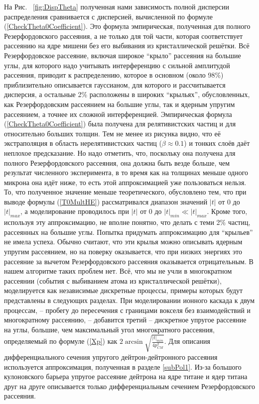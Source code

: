 \documentclass[a4paper,12pt]{article}
\begin{document}
\begin{large}
  На Рис. ~\ref{fig:DispTheta} полученная нами зависимость полной дисперсии распределения сравнивается с дисперсией, вычисленной по формуле (\ref{CheckTheta0Coefficient}). Это формула эмпирическая, полученная для полного Резерфордовского рассеяния, а не только для той части, которая соответствует рассеянию на ядре мишени без его выбивания из кристаллической решётки.
  Всё Резерфордовское рассеяние, включая широкое ``крыло'' рассеяния на большие углы, для которого надо учитывать интерференцию с сильной амплитудой рассеяния, приводит к распределению, которое в основном (около 98\%) приблизительно описывается гауссианом, для которого и рассчитывается дисперсия, а остальные 2\% расположены в широких ``крыльях'', обусловленных, как Резерфордовским рассеянием на большие углы, так и ядерным упругим рассеянием, а точнее их сложной интерференцией.
  Эмпирическая формула (\ref{CheckTheta0Coefficient}) была получена для релятивистских частиц и для относительно больших толщин.
  Тем не менее из рисунка видно, что её экстраполяция в область нерелятивистских частиц ($\beta\approx 0.1$) и тонких слоёв даёт неплохое предсказание.
  Но надо отметить, что, поскольку она получена для полного Резерфордовского рассеяния, она должна быть везде больше, чем результат численного эксперимента, в то время как на толщинах  меньше одного микрона она идёт ниже, то есть этой аппроксимацией уже пользоваться нельзя.
  То, что полученное значение меньше теоретического, обусловлено тем, что при выводе формулы (\ref{T0MultHE}) рассматривался диапазон значений $|t|$ от 0 до $|t|_{max}$, а моделирование проводилось при $|t|$ от 0 до $|t|_{min} \ll |t|_{max}$.
  Кроме того, используя эту аппроксимацию, не вполне понятно, что делать с теми 2\% частиц,  рассеянных на большие углы.
  Попытка придумать аппроксимацию для ``крыльев'' не имела успеха.
  Обычно считают, что эти крылья можно описывать ядерным упругим рассеянием, но на поверку оказывается, что при низких энергиях это рассеяние за вычетом Резерфордовского рассеяния оказывается отрицательным.
  В нашем алгоритме таких проблем нет.
  Всё, что мы не учли в многократном рассеянии (события с выбиванием атома из кристаллической решётки), моделируется как независимые дискретные процессы, примеры которых будут представлены в следующих разделах.
  При моделировании ионного каскада к двум процессам, -- пробегу до пересечения с границами вокселя без взаимодействий и многократному рассеянию, -- добавится третий -- дискретное упругое рассеяние на углы, большие, чем максимальный угол многократного рассеяния, определяемый по формуле (\ref{Xp}) как $2\arcsin{\sqrt{ \frac{|t|_{min}}{4 p_{CM}^2}} }$.
  Для описания дифференциального сечения упругого дейтрон-дейтронного рассеяния используется аппроксимация, полученная в разделе \ref{subPol1}.
  Из-за большого кулоновского барьера упругое рассеяние дейтрона на ядре титане и ядер титана друг на друге описывается только дифференциальным сечением Резерфордовского рассеяния.
  

\end{large}
\end{document}
